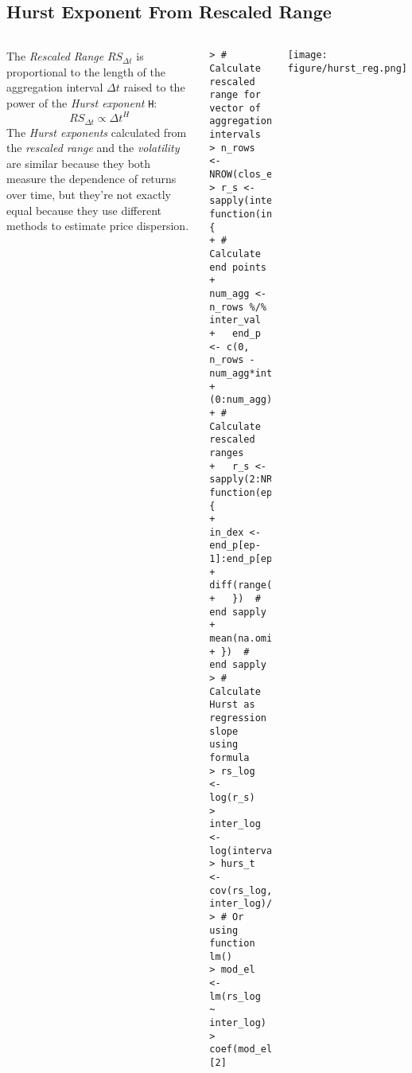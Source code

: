 \documentclass[10pt]{beamer}\usepackage[]{graphicx}\usepackage[]{color}
\makeatletter
\newenvironment{kframe}{%
 \def\at@end@of@kframe{}%
 \ifinner\ifhmode%
  \def\at@end@of@kframe{\end{minipage}}%
  \begin{minipage}{\columnwidth}%
 \fi\fi%
 \def\FrameCommand##1{\hskip\@totalleftmargin \hskip-\fboxsep
 \colorbox{shadecolor}{##1}\hskip-\fboxsep
     \hskip-\linewidth \hskip-\@totalleftmargin \hskip\columnwidth}%
 \MakeFramed {\advance\hsize-\width
   \@totalleftmargin\z@ \linewidth\hsize
   \@setminipage}}%
 {\par\unskip\endMakeFramed%
 \at@end@of@kframe}
\newenvironment{knitrout}{}{} %
\makeatother
\begin{document}
\subsection{Hurst Exponent From Rescaled Range}
\begin{frame}[fragile,t]{\subsecname}
\vspace{-1em}
\begin{block}{}
  \begin{columns}[T]
      The \emph{Rescaled Range} $RS_{\Delta t}$ is proportional to the length of the aggregation interval $\Delta t$ raised to the power of the \emph{Hurst exponent} \texttt{H}:
      \begin{displaymath}
        RS_{\Delta t} \propto {\Delta t}^H
      \end{displaymath}
      The \emph{Hurst exponents} calculated from the \emph{rescaled range} and the \emph{volatility} are similar because they both measure the dependence of returns over time, but they're not exactly equal because they use different methods to estimate price dispersion.
      \vspace{-1em}
\begin{knitrout}\tiny
{}\color{fgcolor}\begin{kframe}
\begin{verbatim}
> # Calculate rescaled range for vector of aggregation intervals
> n_rows <- NROW(clos_e)
> r_s <- sapply(interval_s, function(inter_val) {
+ # Calculate end points
+   num_agg <- n_rows %/% inter_val
+   end_p <- c(0, n_rows - num_agg*inter_val + (0:num_agg)*inter_val)
+ # Calculate rescaled ranges
+   r_s <- sapply(2:NROW(end_p), function(ep) {
+     in_dex <- end_p[ep-1]:end_p[ep]
+     diff(range(clos_e[in_dex]))/sd(re_turns[in_dex])
+   })  # end sapply
+   mean(na.omit(r_s))
+ })  # end sapply
> # Calculate Hurst as regression slope using formula
> rs_log <- log(r_s)
> inter_log <- log(interval_s)
> hurs_t <- cov(rs_log, inter_log)/var(inter_log)
> # Or using function lm()
> mod_el <- lm(rs_log ~ inter_log)
> coef(mod_el)[2]
\end{verbatim}
\end{kframe}
\end{knitrout}
      \vspace{-1em}
      \texttt{[image: figure/hurst\_reg.png]}
      \vspace{-1em}
\begin{knitrout}\tiny

\end{knitrout}
\end{columns}
\end{block}
\end{frame}
\end{document}
